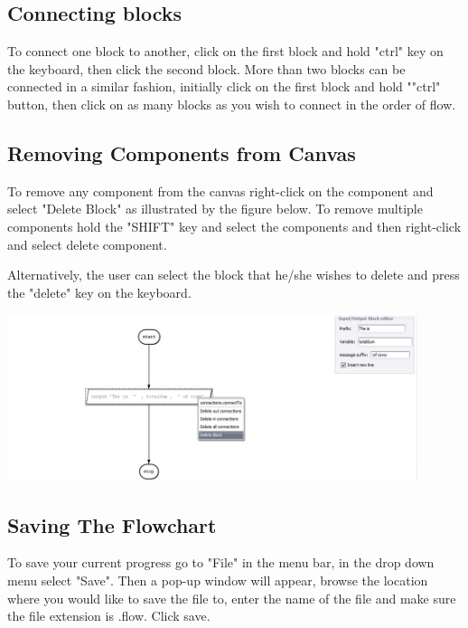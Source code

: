 \documentclass[11pt,a4paper,titlepage]{article}
\begin{document}
	\subsection{Connecting blocks}
	
	To connect one block to another, click on the first block and hold "ctrl" key on the keyboard, then click the second block. More than two blocks can be connected in a similar fashion, initially click on the first block and hold ""ctrl" button, then click on as many blocks as you wish to connect in the order of flow.
				
	\subsection{Removing Components from Canvas}
	
	To remove any component from the canvas right-click on the component and select "Delete Block" as illustrated by the figure below. To remove multiple components hold the "SHIFT" key and select the components and then right-click and select delete component.\newline
	
	Alternatively, the user can select the block that he/she wishes to delete and press the "delete" key on the keyboard. \newline
	
	\includegraphics[width=12cm]{images/deleteComponent.jpg} \newline
		
	\subsection{Saving The Flowchart}
	
	To save your current progress go to "File" in the menu bar, in the drop down menu select "Save". Then a pop-up window will appear, browse the location where you would like to save the file to, enter the name of the file and make sure the file extension is .flow. Click save. \newline \newline
	
\end{document}
